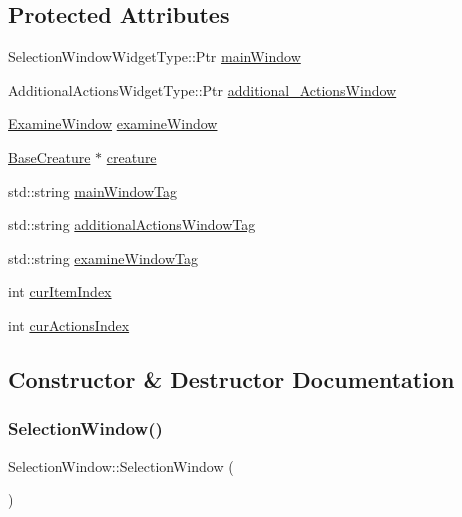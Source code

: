 \subsection*{Protected Attributes}
\begin{DoxyCompactItemize}
\item 
Selection\+Window\+Widget\+Type\+::\+Ptr \mbox{\hyperlink{class_selection_window_a3e5feb8488453e7c33efadd077880ff2}{main\+Window}}
\item 
Additional\+Actions\+Widget\+Type\+::\+Ptr \mbox{\hyperlink{class_selection_window_a7543c33777eaf4cb575db26d01e06799}{additional\+\_\+\+Actions\+Window}}
\item 
\mbox{\hyperlink{class_examine_window}{Examine\+Window}} \mbox{\hyperlink{class_selection_window_a1cf060933cc18beacb9761822302bbc2}{examine\+Window}}
\item 
\mbox{\hyperlink{class_base_creature}{Base\+Creature}} $\ast$ \mbox{\hyperlink{class_selection_window_a36cc06d3f91e1fdb38de57a85bd39db0}{creature}}
\item 
std\+::string \mbox{\hyperlink{class_selection_window_a555e8cf723b237c5a2bef0f190e03c76}{main\+Window\+Tag}}
\item 
std\+::string \mbox{\hyperlink{class_selection_window_ae21c9fb80565153e0dc21b30f42e5db3}{additional\+Actions\+Window\+Tag}}
\item 
std\+::string \mbox{\hyperlink{class_selection_window_a0079f617d7d1382810243df2456b6676}{examine\+Window\+Tag}}
\item 
int \mbox{\hyperlink{class_selection_window_a51b338a9f0d20066ff6a9c81ac215b2f}{cur\+Item\+Index}}
\item 
int \mbox{\hyperlink{class_selection_window_a5ea8876aaf7d1065eaa38698aded6d71}{cur\+Actions\+Index}}
\end{DoxyCompactItemize}


\subsection{Constructor \& Destructor Documentation}
\mbox{\label{class_selection_window_a4679147ef0f718a3cb73997695b4dca9}} 
\subsubsection{\texorpdfstring{Selection\+Window()}{SelectionWindow()}}
{\footnotesize\ttfamily Selection\+Window\+::\+Selection\+Window (\begin{DoxyParamCaption}{ }\end{DoxyParamCaption})}



